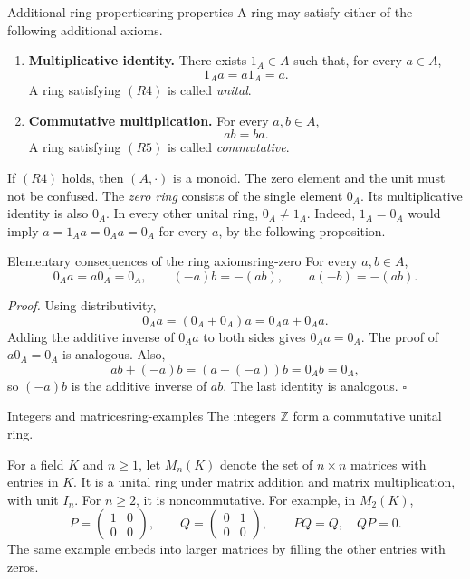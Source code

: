 \documentclass[10pt,a4paper]{article}
\newcommand{\Z}{\mathbb{Z}}
\begin{document}
\begin{definition}{Additional ring properties}{ring-properties}
A ring may satisfy either of the following additional axioms.
\begin{enumerate}[label=\textup{(R\arabic*)},start=4]
  \item \textbf{Multiplicative identity.} There exists $1_A\in A$ such
  that, for every $a\in A$,
  \[
    1_Aa=a1_A=a.
  \]
  A ring satisfying $(R4)$ is called \emph{unital}.

  \item \textbf{Commutative multiplication.} For every $a,b\in A$,
  \[
    ab=ba.
  \]
  A ring satisfying $(R5)$ is called \emph{commutative}.
\end{enumerate}
\end{definition}

If $(R4)$ holds, then $(A,\cdot)$ is a monoid. The zero element and the unit
must not be confused. The \emph{zero ring} consists of the single element
$0_A$. Its multiplicative identity is also $0_A$. In every other unital ring,
$0_A\neq1_A$. Indeed, $1_A=0_A$ would imply $a=1_Aa=0_Aa=0_A$ for every $a$, by
the following proposition.

\begin{proposition}{Elementary consequences of the ring axioms}{ring-zero}
For every $a,b\in A$,
\[
  0_Aa=a0_A=0_A,
  \qquad
  (-a)b=-(ab),
  \qquad
  a(-b)=-(ab).
\]
\end{proposition}

\textit{Proof.}
Using distributivity,
\[
  0_Aa=(0_A+0_A)a=0_Aa+0_Aa.
\]
Adding the additive inverse of $0_Aa$ to both sides gives $0_Aa=0_A$.
The proof of $a0_A=0_A$ is analogous. Also,
\[
  ab+(-a)b=(a+(-a))b=0_Ab=0_A,
\]
so $(-a)b$ is the additive inverse of $ab$. The last identity is analogous.
\hfill$\square$

\begin{examplebox}{Integers and matrices}{ring-examples}
The integers $\Z$ form a commutative unital ring.

For a field $K$ and $n\geq1$, let $M_n(K)$ denote the set of $n\times n$
matrices with entries in $K$. It is a unital ring under matrix addition and
matrix multiplication, with unit $I_n$. For $n\geq2$, it is noncommutative.
For example, in $M_2(K)$,
\[
  P=\begin{pmatrix}1&0\\0&0\end{pmatrix},
  \qquad
  Q=\begin{pmatrix}0&1\\0&0\end{pmatrix},
  \qquad PQ=Q,\quad QP=0.
\]
The same example embeds into larger matrices by filling the other entries
with zeros.
\end{examplebox}
\end{document}
